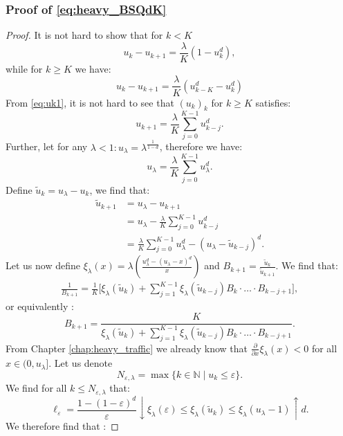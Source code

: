 \documentclass[12pt]{report}
\begin{document}
\subsubsection{Proof of \eqref{eq:heavy_BSQdK}}
\begin{proof}
It is not hard to show that for $k< K$
$$
u_k - u_{k+1}=\frac{\lambda}{K} (1-u_k^d),
$$
while for $k \geq K$ we have:
\begin{equation} \label{eq:uk1}
u_k - u_{k+1} = \frac{\lambda}{K} (u_{k-K}^d - u_k^d)
\end{equation}
From \eqref{eq:uk1}, it is not hard to see that $(u_k)_k$ for $k \geq K$ satisfies:
\begin{equation}\label{eq:rec_uk}
u_{k+1} = \frac{\lambda}{K} \sum_{j=0}^{K-1} u_{k-j}^d.
\end{equation}
Further, let for any $\lambda < 1: u_{\lambda}=\lambda^{\frac{1}{1-d}}$, therefore we have:
$$
u_\lambda = \frac{\lambda}{K} \sum_{j=0}^{K-1} u_\lambda^d.
$$
Define $\tilde u_k = u_\lambda - u_k$, we find that:
\begin{align*}
\tilde u_{k+1}
&= u_\lambda - u_{k+1}\\
&= u_\lambda - \frac{\lambda}{K} \sum_{j=0}^{K-1} u_{k-j}^d\\
&= \frac{\lambda}{K} \sum_{j=0}^{K-1} u_\lambda^d - (u_\lambda - \tilde{u}_{k-j})^d.
\end{align*}
Let us now define $\xi_\lambda(x)=\lambda\left( \frac{u_\lambda^d-(u_\lambda-x)^d}{x} \right)$ and $B_{k+1}=\frac{\tilde{u}_k}{\tilde u_{k+1}}$. We find that:
\begin{align*}
\frac{1}{B_{k+1}} = \frac{1}{K} \bigg[ \xi_{\lambda}(\tilde u_k) + \sum_{j=1}^{K-1} \xi_{\lambda} (\tilde u_{k-j}) B_k \cdot \dots \cdot B_{k-j+1} \bigg],
\end{align*}
or equivalently :
\begin{equation}\label{eq:rec_Bklam}
B_{k+1} = \frac{K}{\xi_\lambda(\tilde u_k) + \sum_{j=1}^{K-1} \xi_\lambda(\tilde u_{k-j}) B_k \cdot \dots \cdot B_{k-j+1}}.
\end{equation}
From Chapter \ref{chap:heavy_traffic} we already know that $\frac{\partial}{\partial x} \xi_\lambda(x) < 0$ for all $x \in (0,u_\lambda]$. Let us denote
$$
N_{\varepsilon, \lambda} = \max\{k \in \mathbb{N} \mid u_k \leq \varepsilon\}.
$$
We find for all $k \leq N_{\varepsilon, \lambda}$ that:
$$
\ell_{\varepsilon} = \frac{1-(1-\varepsilon)^d}{\varepsilon} \downarrow \xi_\lambda(\varepsilon) \leq \xi_{\lambda}(\tilde u_k) \leq \xi_\lambda (u_\lambda -1) \uparrow d.
$$
We therefore find that :

\end{proof}
\end{document}
